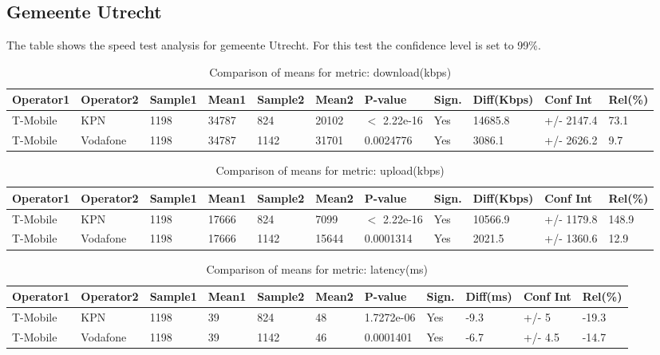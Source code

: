 \documentclass[]{article}
\begin{document}
\normalsize

\newpage

\subsection{Gemeente Utrecht}\label{gemeente-utrecht}

The table shows the speed test analysis for gemeente Utrecht. For this
test the confidence level is set to 99\%.

\begin{table}[ht]
\centering
{\footnotesize
\begin{tabular}{lllllllllll}
  \hline
Operator1 & Operator2 & Sample1 & Mean1 & Sample2 & Mean2 & P-value & Sign. & Diff(Kbps) & Conf Int & Rel(\%) \\ 
  \hline
T-Mobile & KPN & 1198 & 34787 & 824 & 20102 & $<$ 2.22e-16 & Yes & 14685.8 & +/- 2147.4 & 73.1 \\ 
  T-Mobile & Vodafone & 1198 & 34787 & 1142 & 31701 & 0.0024776 & Yes & 3086.1 & +/- 2626.2 & 9.7 \\ 
   \hline
\end{tabular}
}
\caption{Comparison of means for metric: download(kbps)} 
\end{table}

\begin{table}[ht]
\centering
{\footnotesize
\begin{tabular}{lllllllllll}
  \hline
Operator1 & Operator2 & Sample1 & Mean1 & Sample2 & Mean2 & P-value & Sign. & Diff(Kbps) & Conf Int & Rel(\%) \\ 
  \hline
T-Mobile & KPN & 1198 & 17666 & 824 & 7099 & $<$ 2.22e-16 & Yes & 10566.9 & +/- 1179.8 & 148.9 \\ 
  T-Mobile & Vodafone & 1198 & 17666 & 1142 & 15644 & 0.0001314 & Yes & 2021.5 & +/- 1360.6 & 12.9 \\ 
   \hline
\end{tabular}
}
\caption{Comparison of means for metric: upload(kbps)} 
\end{table}

\begin{table}[ht]
\centering
{\footnotesize
\begin{tabular}{lllllllllll}
  \hline
Operator1 & Operator2 & Sample1 & Mean1 & Sample2 & Mean2 & P-value & Sign. & Diff(ms) & Conf Int & Rel(\%) \\ 
  \hline
T-Mobile & KPN & 1198 & 39 & 824 & 48 & 1.7272e-06 & Yes & -9.3 & +/- 5 & -19.3 \\ 
  T-Mobile & Vodafone & 1198 & 39 & 1142 & 46 & 0.0001401 & Yes & -6.7 & +/- 4.5 & -14.7 \\ 
   \hline
\end{tabular}
}
\caption{Comparison of means for metric: latency(ms)} 
\end{table}
\end{document}
